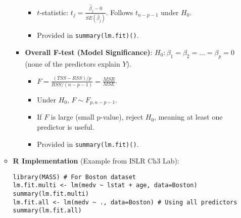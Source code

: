 \documentclass[12pt,a4paper]{article}
\newcommand{\Rfunction}[1]{\texttt{#1()}} %
\begin{document}
\begin{itemize}
\begin{itemize}
\begin{itemize}
                        \begin{itemize}
                            \item $t$-statistic: $t_j = \frac{\hat{\beta}_j - 0}{SE(\hat{\beta}_j)}$. Follows $t_{n-p-1}$ under $H_0$.
                            \item Provided in \Rfunction{summary(lm.fit)}.
                        \end{itemize}
                    \item \textbf{Overall F-test (Model Significance)}: $H_0: \beta_1 = \beta_2 = \dots = \beta_p = 0$ (none of the predictors explain $Y$).
                        \begin{itemize}
                            \item $F = \frac{(TSS-RSS)/p}{RSS/(n-p-1)} = \frac{MSR}{MSE}$.
                            \item Under $H_0$, $F \sim F_{p, n-p-1}$.
                            \item If $F$ is large (small p-value), reject $H_0$, meaning at least one predictor is useful.
                            \item Provided in \Rfunction{summary(lm.fit)}.
                        \end{itemize}
                \end{itemize}
            \item \textbf{R Implementation} (Example from ISLR Ch3 Lab):
\begin{lstlisting}[caption={Multiple Linear Regression for Boston Housing Data}]
library(MASS) # For Boston dataset
lm.fit.multi <- lm(medv ~ lstat + age, data=Boston)
summary(lm.fit.multi)
lm.fit.all <- lm(medv ~ ., data=Boston) # Using all predictors
summary(lm.fit.all)
\end{lstlisting}
        \end{itemize}


\end{itemize}
\end{document}
